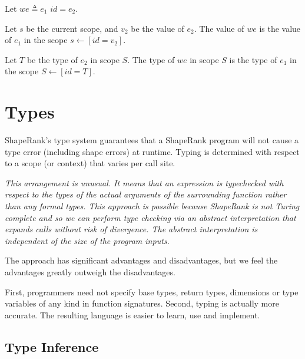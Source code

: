 \documentclass{article}
\begin{document}
{\WhereBindingExpression{}

\VALIDENT{}


Let $we \triangleq e_1$ \WHERE{} $id = e_2$.

Let $s$ be the current scope, and $v_2$ be the value of $e_2$. The value of $we$ is the value of $e_1$ in the scope $s \leftarrow [id = v_2]$.

Let $T$ be the type of $e_2$ in scope $S$. The type of $we$ in scope $S$ is the type of $e_1$ in the scope $S \leftarrow [id = T]$.


\section{Types}
\label{types}

ShapeRank's type system guarantees that a ShapeRank program will not cause a type error (including shape errors) at runtime. 
Typing is determined with respect to a scope (or context) that varies per call site. 

{\it
This arrangement is unusual. It means that an expression is typechecked with respect to the types of the actual arguments of the surrounding function rather  than any
formal types. This approach is possible because ShapeRank is not Turing complete and so we can perform type checking via an abstract interpretation that expands calls without risk of
divergence. The abstract interpretation is independent of the size of the program inputs.

The approach has significant advantages and disadvantages, but we feel the advantages greatly outweigh the disadvantages.

First, programmers need not specify base types, return types,  dimensions or type variables of any kind in function signatures. Second, typing is actually more accurate.
The resulting language is easier to learn, use and implement.
} 




{\em 
}

 \subsection{Type Inference}
  \label{typeInference}

}
\end{document}
